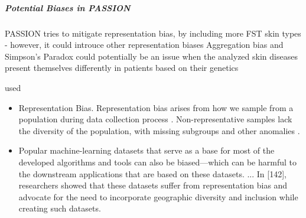 \documentclass[12pt, a4paper, oneside]{book}   	%
\newif\ifrawcitationactive
\newcommand{\rawcitationstart}{\color{purple}\rawcitationactivetrue}
\newcommand{\rawcitationusedstart}{\color{violet}}
\begin{document}
				
				\subparagraph{Potential Biases in PASSION}
				PASSION tries to mitigate representation bias, by including more FST skin types - however, it could introuce other representation biases
				Aggregation bias and Simpson's Paradox could potentially be an issue when the analyzed skin diseases present themselves differently in patients based on their genetics
				
				
				\rawcitationstart
				used
				\begin{itemize}		
					\rawcitationusedstart
					\item Representation Bias. Representation bias arises from how we sample from a population during data collection process \autocite{M144_Suresh_2021}. Non-representative samples lack the diversity of the population, with missing subgroups and other anomalies \autocite{Mehrabi_2021}.
					\item Popular machine-learning datasets that serve as a base for most of the developed algorithms and tools can also be biased—which can be harmful to the downstream applications that are based on these datasets. ... In [142], researchers showed that these datasets suffer from representation bias and advocate for the need to incorporate geographic diversity and inclusion while creating such datasets. \autocite{Mehrabi_2021}
				

\end{itemize}
\end{document}
